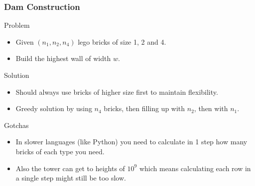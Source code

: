 \documentclass{beamer}
\begin{document}
\begin{frame}
    \frametitle{Dam Construction}
    \begin{block}{Problem}
        \begin{itemize}
            \item Given $(n_1, n_2, n_4)$ lego bricks of size 1, 2 and 4.
            \item Build the highest wall of width $w$.
        \end{itemize}
    \end{block} \pause
    \begin{block}{Solution}
        \begin{itemize}
            \item Should always use bricks of higher size first to maintain flexibility.
            \pause
            \item Greedy solution by using $n_4$ bricks, then filling up with $n_2$, then with $n_1$.
        \end{itemize}
    \end{block} \pause
    \begin{block}{Gotchas}
        \begin{itemize}
            \item In slower languages (like Python) you need to calculate in 1 step how many bricks of each type you need.
            \item Also the tower can get to heights of $10^9$ which means calculating each row in a single step might still be too slow.
        \end{itemize}
    \end{block} 
\end{frame}
\end{document}
